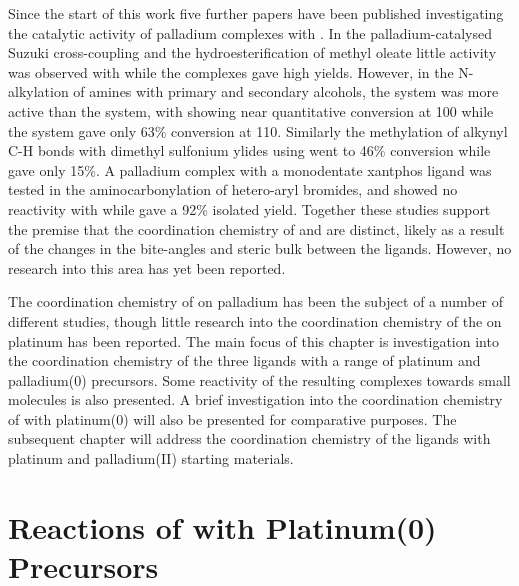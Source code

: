 Since the start of this work five further papers have been published investigating the catalytic activity of palladium complexes with \tBuxantphos{}.\cite{Ashcroft2013, Behr2013, Friis2014, Dang2013, Liu2013c}  In the palladium-catalysed Suzuki cross-coupling and the hydroesterification of methyl oleate little activity was observed with \tBuxantphos{} while the \Phxantphos{} complexes gave high yields.\cite{Ashcroft2013, Behr2013}  However, in the N-alkylation of amines with primary and secondary alcohols, the \tBuxantphos{} system was more active than the \Phxantphos{} system, with \tBuxantphos showing near quantitative conversion at 100\degC{} while the \Phxantphos{} system gave only 63\% conversion at 110\degC.  Similarly the methylation of alkynyl C-H bonds with dimethyl sulfonium ylides using \tBuxantphos{} went to 46\% conversion while \Phxantphos{} gave only 15\%.\cite{Liu2013c}  A palladium complex with a monodentate xantphos ligand was tested in the aminocarbonylation of hetero-aryl bromides, and showed no reactivity with \tBuxantphos{} while \Phxantphos gave a 92\% isolated yield.\cite{Friis2014}  Together these studies support the premise that the coordination chemistry of \tBuxantphos{} and \Phxantphos{} are distinct, likely as a result of the changes in the bite-angles and steric bulk between the ligands.  However, no research into this area has yet been reported. 

The coordination chemistry of \Phxantphos{} on palladium has been the subject of a number of different studies, though little research into the coordination chemistry of the \Phxantphos{} on platinum has been reported.\cite{Zuideveld2002, Raebiger2004, Bakhmutov2012, Miedaner2004, Klingensmith2006, Petocz2004, Yin2002}  The main focus of this chapter is investigation into the coordination chemistry of the three \tBuxantphos{} ligands with a range of  platinum and palladium(0) precursors.  Some reactivity of the resulting complexes towards small molecules is also presented.  A brief investigation into the coordination chemistry of \Phthixantphos{} with platinum(0) will also be presented for comparative purposes.  The subsequent chapter will address the coordination chemistry of the \tBuxantphos{} ligands with platinum and palladium(II) starting materials.  


\section{Reactions of \Phthixantphos{} with Platinum(0) Precursors}

